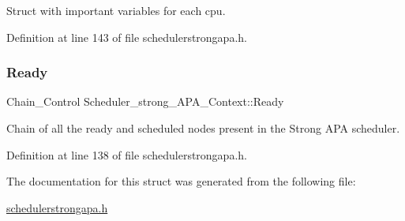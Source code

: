 Struct with important variables for each cpu. 



Definition at line 143 of file schedulerstrongapa.\+h.

\mbox{\label{structScheduler__strong__APA__Context_a0c445c35a07b8aa14f9d76c6dfb4916c}} 
\subsubsection{\texorpdfstring{Ready}{Ready}}
{\footnotesize\ttfamily Chain\+\_\+\+Control Scheduler\+\_\+strong\+\_\+\+A\+P\+A\+\_\+\+Context\+::\+Ready}



Chain of all the ready and scheduled nodes present in the Strong A\+PA scheduler. 



Definition at line 138 of file schedulerstrongapa.\+h.



The documentation for this struct was generated from the following file\+:\begin{DoxyCompactItemize}
\item 
\hyperlink{schedulerstrongapa_8h}{schedulerstrongapa.\+h}\end{DoxyCompactItemize}
